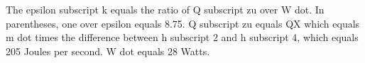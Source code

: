The epsilon subscript k equals the ratio of Q subscript zu over W dot. In parentheses, one over epsilon equals 8.75. Q subscript zu equals QX which equals m dot times the difference between h subscript 2 and h subscript 4, which equals 205 Joules per second. W dot equals 28 Watts.